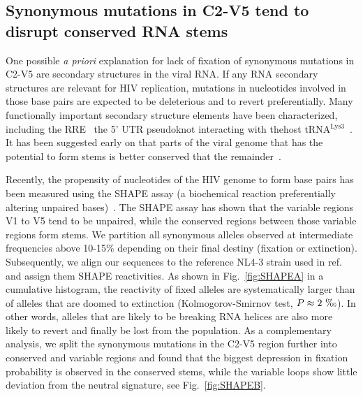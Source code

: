 \documentclass[rmp, twocolumn]{revtex4}
\newcommand{\FIG}[1]{Fig.~\ref{fig:#1}}
\begin{document}
\subsection{Synonymous mutations in C2-V5 tend to disrupt conserved RNA stems}
One possible {\it a priori} explanation for lack of fixation of synonymous
mutations in C2-V5 are  secondary structures in the viral RNA. If any RNA
secondary structures are relevant for HIV replication, mutations in nucleotides
involved in those base pairs are expected to be deleterious and to revert
preferentially. Many functionally important secondary structure elements have
been characterized, including  the RRE~\citep{fernandes_hiv-1_2012} the
5' UTR pseudoknot interacting with thehost tRNA$^\text{Lys3}$~\citep{barat_interaction_1991,
paillart_vitro_2002}. It has been suggested early on that parts of the viral
genome that has the potential to form stems is better conserved that the
remainder~\citep{forsdyke_reciprocal_1995}.

Recently, the propensity of nucleotides of the HIV genome to form base pairs has
been measured using the SHAPE assay (a biochemical reaction preferentially
altering unpaired bases)~\citep{watts_architecture_2009}. The SHAPE assay has
shown that the variable regions V1 to V5 tend to be unpaired, while the
conserved regions between those variable regions form stems. We partition all
synonymous alleles observed at intermediate frequencies above 10-15\% depending
on their final destiny (fixation or extinction). Subsequently, we align our
sequences to the reference NL4-3 strain used in
ref.~\citep{watts_architecture_2009} and assign them SHAPE reactivities. As
shown in \FIG{SHAPEA} in a cumulative histogram, the reactivity of fixed alleles
are systematically larger than of alleles that are doomed to extinction
(Kolmogorov-Smirnov test, $P\approx 2~\text{\textperthousand}$). In other
words, alleles that are likely to be breaking RNA helices are also more likely
to revert and finally be lost from the population.  As a complementary analysis,
we split the synonymous mutations in the C2-V5 region further into conserved and
variable regions and found that the biggest depression in fixation probability
is observed in the conserved stems, while the variable loops show little
deviation from the neutral signature, see \FIG{SHAPEB}. 
\end{document}
